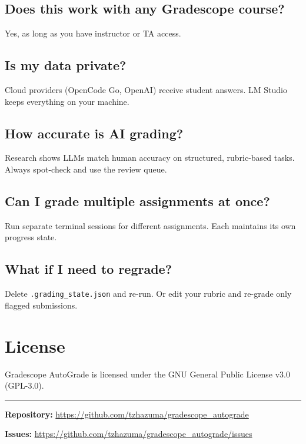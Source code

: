 \documentclass[11pt,a4paper]{article}
\begin{document}
\subsection*{Does this work with any Gradescope course?}
Yes, as long as you have instructor or TA access.

\subsection*{Is my data private?}
Cloud providers (OpenCode Go, OpenAI) receive student answers. LM Studio keeps everything on your machine.

\subsection*{How accurate is AI grading?}
Research shows LLMs match human accuracy on structured, rubric-based tasks. Always spot-check and use the review queue.

\subsection*{Can I grade multiple assignments at once?}
Run separate terminal sessions for different assignments. Each maintains its own progress state.

\subsection*{What if I need to regrade?}
Delete \texttt{.grading\_state.json} and re-run. Or edit your rubric and re-grade only flagged submissions.

\section{License}

Gradescope AutoGrade is licensed under the GNU General Public License v3.0 (GPL-3.0).

\vspace{1cm}
\begin{center}
\rule{0.5\textwidth}{0.5pt}

\vspace{0.5cm}
\textbf{Repository:} \url{https://github.com/tzhazuma/gradescope_autograde}

\textbf{Issues:} \url{https://github.com/tzhazuma/gradescope_autograde/issues}
\end{center}
\end{document}
